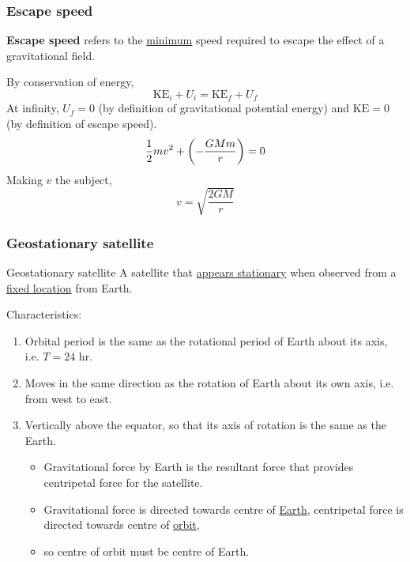 \subsubsection{Escape speed}
\textbf{Escape speed} refers to the \underline{minimum} speed required to escape the effect of a gravitational field.

By conservation of energy,
\[ \text{KE}_i + U_i = \text{KE}_f + U_f \]
At infinity, $U_f = 0$ (by definition of gravitational potential energy) and $\text{KE}=0$ (by definition of escape speed).
\[ \frac{1}{2} mv^2 + \left(-\frac{GMm}{r}\right) = 0 \]
Making $v$ the subject,
\[ \boxed{v = \sqrt{\frac{2GM}{r}}} \]

\subsubsection{Geostationary satellite}
\begin{defn}{Geostationary satellite}{}
A satellite that \underline{appears stationary} when observed from a \underline{fixed location} from Earth.
\end{defn}

Characteristics:
\begin{enumerate}
\item Orbital period is the same as the rotational period of Earth about its axis, i.e. $T = 24$ \unit{hr}.
\item Moves in the same direction as the rotation of Earth about its own axis, i.e. from west to east.
\item Vertically above the equator, so that its axis of rotation is the same as the Earth.
    \begin{itemize}
    \item Gravitational force by Earth is the resultant force that provides centripetal force for the satellite. 
    \item Gravitational force is directed towards centre of \underline{Earth}, centripetal force is directed towards centre of \underline{orbit},
    \item so centre of orbit must be centre of Earth.
    \end{itemize}
\end{enumerate}
\pagebreak
